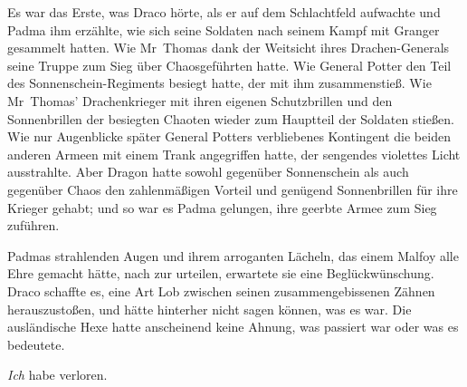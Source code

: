 Es war das Erste, was Draco hörte, als er auf dem Schlachtfeld aufwachte und Padma ihm erzählte, wie sich seine Soldaten nach seinem Kampf mit Granger gesammelt hatten. Wie Mr~Thomas dank der Weitsicht ihres Drachen-Generals seine Truppe zum Sieg über Chaosgeführten hatte.
Wie General Potter den Teil des Sonnenschein-Regiments besiegt hatte, der mit ihm zusammenstieß. Wie Mr~Thomas' Drachenkrieger mit ihren eigenen Schutzbrillen und den Sonnenbrillen der besiegten Chaoten wieder zum Hauptteil der Soldaten stießen. Wie nur Augenblicke später General Potters verbliebenes Kontingent die beiden anderen Armeen mit einem Trank angegriffen hatte, der sengendes violettes Licht ausstrahlte. Aber Dragon hatte sowohl gegenüber Sonnenschein als auch gegenüber Chaos den zahlenmäßigen Vorteil und genügend Sonnenbrillen für ihre Krieger gehabt; und so war es Padma gelungen, ihre geerbte Armee zum Sieg zuführen.

Padmas strahlenden Augen und ihrem arroganten Lächeln, das einem Malfoy alle Ehre gemacht hätte, nach zur urteilen, erwartete sie eine Beglückwünschung. Draco schaffte es, eine Art Lob zwischen seinen zusammengebissenen Zähnen herauszustoßen, und hätte hinterher nicht sagen können, was es war. Die ausländische Hexe hatte anscheinend keine Ahnung, was passiert war oder was es bedeutete.

\emph{Ich} habe verloren.

